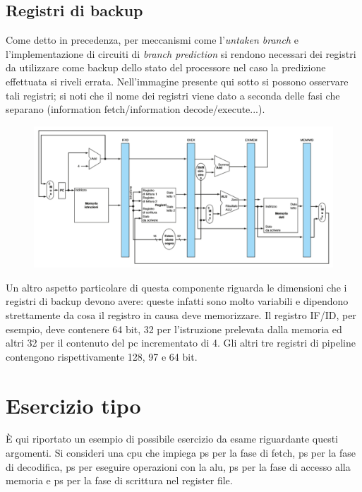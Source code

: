 \documentclass[class=book, crop=false, oneside]{standalone}
\begin{document}
\subsection{Registri di backup}
Come detto in precedenza, per meccanismi come l'\emph{untaken branch} e l'implementazione di circuiti di \emph{branch prediction} si rendono necessari dei registri da utilizzare come backup dello stato del processore nel caso la predizione effettuata si riveli errata. Nell'immagine presente qui sotto si possono osservare tali registri; si noti che il nome dei registri viene dato a seconda delle fasi che separano (information fetch/information decode/execute...).
\begin{figure}[H]
	\centering
	\includegraphics[width=\textwidth,keepaspectratio]{registri-di-backup.png}
\end{figure}
Un altro aspetto particolare di questa componente riguarda le dimensioni che i registri di backup devono avere: queste infatti sono molto variabili e dipendono strettamente da cosa il registro in causa deve memorizzare. Il registro IF/ID, per esempio, deve contenere 64 bit, 32 per l’istruzione prelevata dalla memoria ed altri 32 per il contenuto del \acrshort{pc} incrementato di 4. Gli altri tre registri di pipeline contengono rispettivamente 128, 97 e 64 bit.

\section{Esercizio tipo}
È qui riportato un esempio di possibile esercizio da esame riguardante questi argomenti.
Si consideri una \acrshort{cpu} che impiega \unit[600]{ps} per la fase di fetch, \unit[600]{ps} per la fase di decodifica, \unit[500]{ps} per eseguire operazioni con la \acrshort{alu}, \unit[400]{ps} per la fase di accesso alla memoria e \unit[700]{ps} per la fase di scrittura nel register file.
\end{document}
